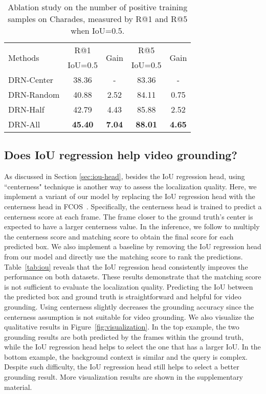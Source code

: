 \documentclass[10pt,twocolumn,letterpaper]{article}
\begin{document}
	\begin{table}[!t]
		\centering
		\caption{Ablation study on the number of positive training samples on Charades, measured by R@1 and R@5 when IoU=0.5.}
		\begin{tabular}{l|c|c|c|c}
			\hline
			\multirow{2}{*}{Methods} &     R@1   &  \multirow{2}{*}{Gain}        &      R@5   &  \multirow{2}{*}{Gain}      \\
			&            IoU=0.5    &      &    IoU=0.5    &        \\ \hline
			DRN-Center              & 38.36       & -           & 83.36  & -   \\
			DRN-Random               & 40.88   & 2.52               & 84.11 & 0.75   \\
			DRN-Half              & 42.79     & 4.43             & 85.88   & 2.52   \\ 
			DRN-All &  \textbf{45.40} & \textbf{7.04} &   \textbf{88.01} & \textbf{4.65} \\ \hline
		\end{tabular}\label{tab:sample_num}
\end{table}
	
	\subsection{Does IoU regression help video grounding?}
	
	As discussed in Section {\ref{sec:iou-head}}, besides the IoU regression head, using ``centerness" technique is another way to assess the localization quality. Here, we implement a variant of our model by replacing the IoU regression head with the centerness head in FCOS~\cite{tian2019fcos}. Specifically, the centerness head is trained to predict a centerness score at each frame. The frame closer to the ground truth's center is expected to have a larger centerness value. In the inference, we follow \cite{tian2019fcos} to multiply the centerness score and matching score to obtain the final score for each predicted box.
	We also implement a baseline by removing the IoU regression head from our model and directly use the matching score to rank the predictions. 
Table~\ref{tab:iou} reveals that the IoU regression head consistently improves the performance on both datasets. These results demonstrate that the matching score is not sufficient to evaluate the localization quality. Predicting the IoU between the predicted box and ground truth is straightforward and helpful for video grounding.
	Using centerness slightly
	decreases the grounding accuracy since the centerness assumption is not suitable for video grounding. We also visualize the qualitative results in Figure~\ref{fig:visualization}. In the top example, the two grounding results are both predicted by the frames within the ground truth, while the IoU regression head helps to select the one that has a larger IoU. In the bottom example, the background context is similar and the query is complex. Despite such difficulty, the IoU regression head still helps to select a better grounding result.
	More visualization results are shown in the supplementary material. 
	
\end{document}
